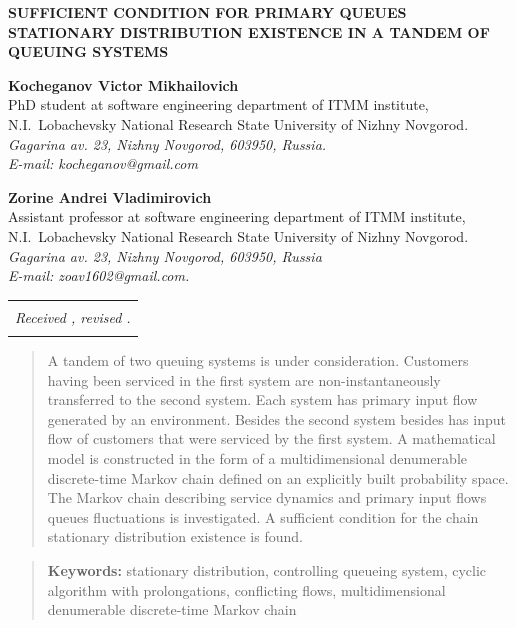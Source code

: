 \documentclass[a4paper,twoside]{article}
\theoremstyle{theorem}
\theoremstyle{remark}
\begin{document}
\newpage
\thispagestyle{plain}
\begin{center}
{\bf SUFFICIENT CONDITION FOR PRIMARY QUEUES STATIONARY DISTRIBUTION EXISTENCE IN A TANDEM OF QUEUING SYSTEMS}
\vspace{4mm}\par
{\bf Kocheganov Victor Mikhailovich}\\
PhD student at software engineering department of ITMM institute,\\ N.I.~Lobachevsky National Research State University of Nizhny Novgorod.\\
{\it Gagarina av. 23, Nizhny Novgorod, 603950, Russia.\\ E-mail: kocheganov@gmail.com}\\ \vspace{2mm}

{\bf Zorine Andrei Vladimirovich}\\
 Assistant professor at software engineering department of ITMM institute,\\
N.I.~Lobachevsky National Research State University of Nizhny Novgorod.\\
{\it  Gagarina av. 23, Nizhny Novgorod, 603950, Russia\\ E-mail: zoav1602@gmail.com.}  
\end{center}
\vspace{2mm}\par

\begin{center}
\renewcommand{\arraystretch}{0}
\begin{tabular}{c}
\hline
\rule{0pt}{2mm}\\
\small\it
Received ,
revised .
\\
\rule{0pt}{2mm}\\
\hline
\end{tabular}
\end{center}

\begin{quote}
 A tandem of two queuing systems is under consideration. Customers having been serviced in the first system  are non-instantaneously  transferred to the second system. Each system has primary input flow generated by an environment. Besides the second system besides has input flow of customers that were serviced by the first system. A mathematical model is constructed in the form of a multidimensional denumerable discrete-time Markov chain defined on an explicitly built probability space. The Markov chain describing service dynamics and primary input flows queues fluctuations is investigated. A sufficient condition for the chain stationary distribution existence is found.
\end{quote}
\begin{quote}
{\bf Keywords:} stationary distribution, controlling queueing system, cyclic algorithm with prolongations, conflicting flows, multidimensional denumerable discrete-time Markov chain
\end{quote}
\vspace{5mm}
\end{document}
